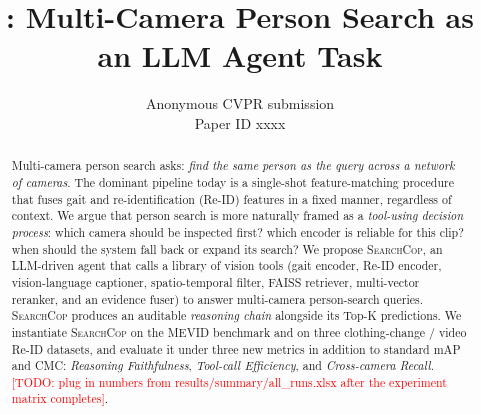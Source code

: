 \documentclass[10pt,twocolumn,letterpaper]{article}
\title{\method: Multi-Camera Person Search as an LLM Agent Task}
\author{Anonymous CVPR submission\\
Paper ID xxxx}
\newcommand{\method}{\textsc{SearchCop}\xspace}
\newcommand{\todo}[1]{\textcolor{red}{[TODO: #1]}}
\begin{document}
\maketitle

\begin{abstract}
Multi-camera person search asks: \emph{find the same person as the query
across a network of cameras}. The dominant pipeline today is a single-shot
feature-matching procedure that fuses gait and re-identification (Re-ID)
features in a fixed manner, regardless of context.
We argue that person search is more naturally framed as a
\emph{tool-using decision process}: which camera should be inspected first?
which encoder is reliable for this clip? when should the system fall back
or expand its search? We propose \method, an LLM-driven agent that calls a
library of vision tools (gait encoder, Re-ID encoder, vision-language
captioner, spatio-temporal filter, FAISS retriever, multi-vector reranker,
and an evidence fuser) to answer multi-camera person-search queries.
\method{} produces an auditable \emph{reasoning chain} alongside its Top-K
predictions. We instantiate \method{} on the MEVID benchmark and on three
clothing-change / video Re-ID datasets, and evaluate it under three new
metrics in addition to standard mAP and CMC: \emph{Reasoning Faithfulness},
\emph{Tool-call Efficiency}, and \emph{Cross-camera Recall}.
\todo{plug in numbers from results/summary/all\_runs.xlsx after the
experiment matrix completes}.
\end{abstract}










\end{document}
